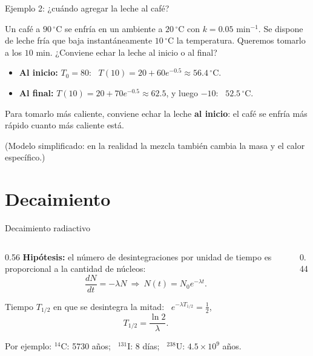 \documentclass[10pt,aspectratio=169]{beamer}
\begin{document}
\begin{frame}{Ejemplo 2: ¿cuándo agregar la leche al café?}
  \begin{ejemplo}
    Un café a $90\,^\circ$C se enfría en un ambiente a $20\,^\circ$C con $k=0.05$ min$^{-1}$. Se dispone de leche fría que baja
    instantáneamente $10\,^\circ$C la temperatura. Queremos tomarlo a los $10$ min. ¿Conviene echar la leche al inicio o al final?
    \begin{itemize}
      \item \textbf{Al inicio:} $T_0=80$: \ $T(10)=20+60e^{-0.5}\approx56.4\,^\circ$C.
      \item \textbf{Al final:} $T(10)=20+70e^{-0.5}\approx62.5$, y luego $-10$: \ $52.5\,^\circ$C.
    \end{itemize}
    Para tomarlo más caliente, conviene echar la leche \textbf{al inicio}: el café se enfría más rápido cuanto más caliente está.
  \end{ejemplo}
  \small (Modelo simplificado: en la realidad la mezcla también cambia la masa y el calor específico.)
\end{frame}

\section{Decaimiento}

\begin{frame}{Decaimiento radiactivo}
  \begin{columns}
    \begin{column}{0.56\textwidth}
      \textbf{Hipótesis:} el número de desintegraciones por unidad de tiempo es proporcional a la cantidad de núcleos:
      \[ \frac{dN}{dt}=-\lambda N\ \Rightarrow\ N(t)=N_0e^{-\lambda t}. \]
      \begin{definicion}
        Tiempo $T_{1/2}$ en que se desintegra la mitad: \ $e^{-\lambda T_{1/2}}=\frac12$,
        \[ T_{1/2}=\frac{\ln2}{\lambda}. \]
      \end{definicion}
      \small Por ejemplo: $^{14}$C: 5730 años; \ $^{131}$I: 8 días; \ $^{238}$U: $4.5\times10^9$ años.
    \end{column}
    \begin{column}{0.44\textwidth}
      \centering
    \end{column}
  \end{columns}
\end{frame}
\end{document}
